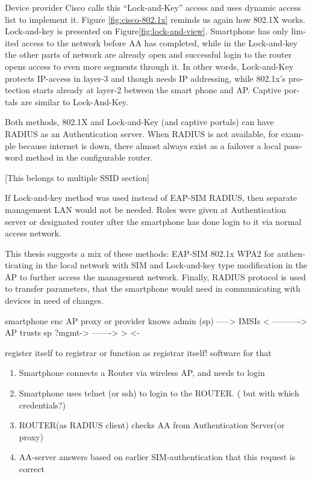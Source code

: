 \documentclass[12pt,a4paper,english]{tutthesis}
\begin{document}
\begin{otherlanguage}{english}
Device provider Cisco calls this
 ``Lock-and-Key''\cite[p.117]{lockandkeybook}
access and uses dynamic access list to implement it.
Figure \ref{fig:cisco-802.1x} reminds us again how 802.1X works. 
Lock-and-key is presented on Figure\ref{fig:lock-and-view}.
 Smartphone has only limited access to the network before AA
has completed, while in the Lock-and-key
the other parts of network are already open and successful login to the router opens
access to even more segments through it. In other words, Lock-and-Key
protects IP-access in layer-3 and though needs IP addressing, while
802.1x's protection starts already at layer-2 between the smart phone
and AP. Captive portals are similar to Lock-And-Key.


Both methods, 802.1X and Lock-and-Key (and captive portals) can have RADIUS as an Authentication server. 
When RADIUS is not available, for example because internet is down,
there almost always exist as a failover a local password method in the configurable 
router.




[This belongs to multiple SSID section]

If Lock-and-key method was used instead of EAP-SIM RADIUS, then
separate manage\-ment LAN would not be needed. Roles were given at
Authentication server or designated router after the smartphone has done login to it
via normal access network.



This thesis suggests a mix of these methods: EAP-SIM 802.1x WPA2 for
authenticating in the local network with SIM and
Lock-and-key type modification in the AP to further access the 
management network. Finally, RADIUS protocol is used to transfer 
parameters, that the smartphone would need in communicating with 
devices in need of changes.


smartphone  enc   AP                proxy or provider knows admin
 (sp)       ----->    
 IMSIs              < ---------->
                  AP trusts sp 
           ?mgmt-> 
                      ------->     >  <-  

register itself to registrar or function as registrar itself!
software for that




\begin{enumerate}
\item Smartphone connects a Router via wireless AP, and needs to login
\item Smartphone uses telnet (or ssh) to login to the ROUTER.
( but with which credentials?)
\item ROUTER(as RADIUS client) checks AA from Authentication Server(or 
proxy)
\item AA-server answers based on earlier SIM-authentication that this
request is correct
\end{enumerate}

\end{otherlanguage}
\end{document}
